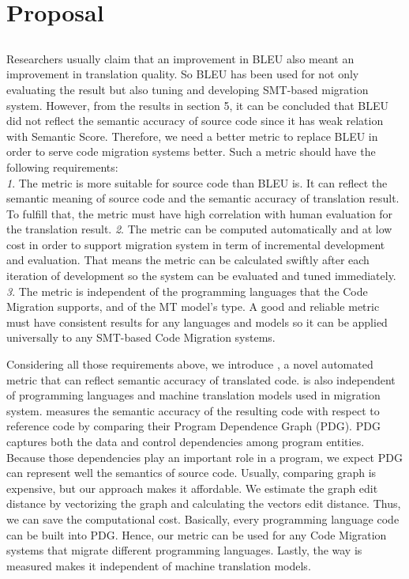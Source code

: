 \section{Proposal}
\subsection{\model}
Researchers usually claim that an improvement in BLEU also meant an improvement in translation quality. So BLEU has been used for not only evaluating the result but also tuning and developing SMT-based migration system. %
However, from the results in section 5, it can be concluded that BLEU did not reflect the semantic accuracy of source code since it has weak relation with Semantic Score. Therefore, we need a better metric to replace BLEU in order to serve code migration systems better. 
Such a metric should have the following requirements:\\ \emph{1}. The metric is more suitable for source code than BLEU is. It can reflect the semantic meaning of source code and the semantic accuracy of translation result. To fulfill that, the metric must have high correlation with human evaluation for the translation result. \emph{2}. The metric can be computed automatically and at low cost in order to support migration system in term of incremental development and evaluation. That means the metric can be calculated swiftly after each iteration of development so the system can be evaluated and tuned immediately. \emph{3}. The metric is independent of the programming languages that the Code Migration supports, and of the MT model's type. A good and reliable metric must have consistent results for any languages and models so it can be applied universally to any SMT-based Code Migration systems.  

Considering all those requirements above, we introduce {\model}, a novel automated metric that can reflect semantic accuracy of translated code. {\model} is also independent of programming languages and machine translation models used in migration system. {\model} measures the semantic accuracy of the resulting code with respect to reference code by comparing their Program Dependence Graph (PDG). PDG captures both the data and control dependencies among program entities. Because those dependencies play an important role in a program, we expect PDG can represent well the semantics of source code. Usually, comparing graph is expensive, but our approach makes it affordable. We estimate the graph edit distance by vectorizing the graph and calculating the vectors edit distance. Thus, we can save the computational cost. Basically, every programming language code can be built into PDG. Hence, our metric can be used for any Code Migration systems that migrate different programming languages. Lastly, the way {\model} is measured makes it independent of machine translation models. 

